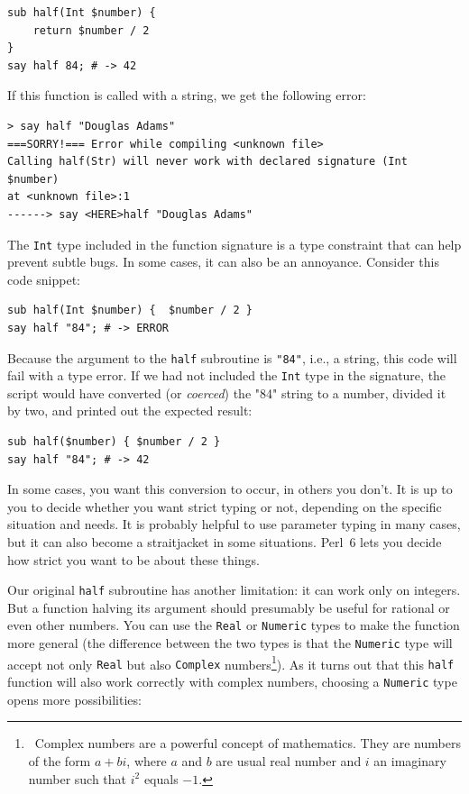\begin{verbatim}
sub half(Int $number) { 
    return $number / 2 
}
say half 84; # -> 42
\end{verbatim}

If this function is called with a string, we get the 
following error:

\begin{verbatim}
> say half "Douglas Adams"
===SORRY!=== Error while compiling <unknown file>
Calling half(Str) will never work with declared signature (Int $number)
at <unknown file>:1
------> say <HERE>half "Douglas Adams"
\end{verbatim}

The {\tt Int} type included in the function signature is a type 
constraint that can help prevent subtle bugs. In some cases, 
it can also be an annoyance. Consider this code snippet:


\begin{verbatim}
sub half(Int $number) {  $number / 2 }
say half "84"; # -> ERROR
\end{verbatim}

Because the argument to the {\tt half} subroutine is {\tt "84"}, 
i.e., a string, this code will fail with a type error. If we had 
not included the {\tt Int} type in the signature, the script 
would have converted (or \emph{coerced}) the "84" string to 
a number, divided it by two, and printed out the expected result:

\begin{verbatim}
sub half($number) { $number / 2 }
say half "84"; # -> 42
\end{verbatim}

In some cases, you want this conversion to occur, in others 
you don't. It is up to you to decide whether you want 
strict typing or not, depending on the specific situation and
needs. It is probably helpful to use parameter typing in many 
cases, but it can also become a straitjacket in some situations. 
Perl~6 lets you decide how strict you want to be about these things.

Our original {\tt half} subroutine has another limitation: it
can work only on integers. But a function halving its argument 
should presumably be useful for rational or even other numbers. 
You can use the {\tt Real} or {\tt Numeric} types to make 
the function more general (the difference between the two 
types is that the {\tt Numeric} type will accept not only 
{\tt Real} but also {\tt Complex} numbers\footnote{~Complex 
numbers are a powerful concept of mathematics. They are numbers 
of the form $a + bi$, where $a$ and $b$ are usual real number and 
$i$ an imaginary number such that $i^2$ equals $-1$.}). As it turns out 
that this {\tt half} function will also work correctly 
with complex numbers, choosing a {\tt Numeric} 
type opens more possibilities:

